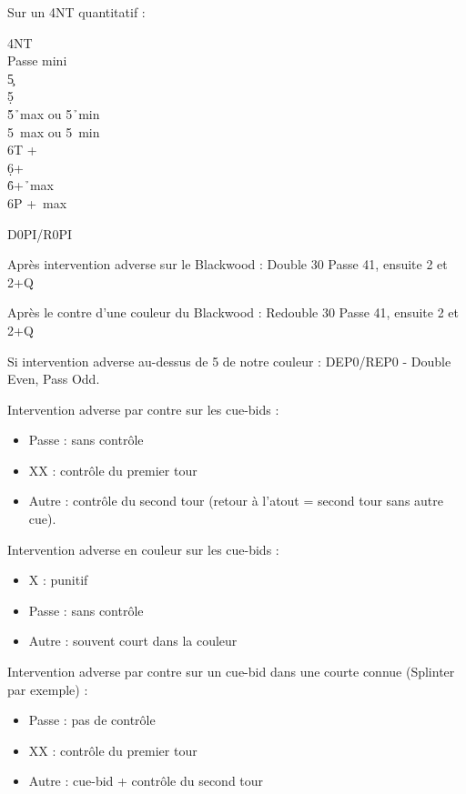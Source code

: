 \documentclass[a4paper]{article}
\begin{document}
Sur un 4NT quantitatif :

\begin{bidtable}
4NT\+\\
Passe \> mini\\
5\c {}\c \\
5\d {}\d \\
5\h {}\h\ max ou 5\h\ min\\
5\s {}\s\ max ou 5\s\ min\\
6T + \c \\
6\d {}+ \d \\
6\h {}+\h\ max\\
6P +\s\ max\-
\end{bidtable}

D0PI/R0PI

Après intervention adverse sur le Blackwood :
Double 30 Passe 41, ensuite 2 et 2+Q

Après le contre d'une couleur du Blackwood :
Redouble 30 Passe 41, ensuite 2 et 2+Q

Si intervention adverse au-dessus de 5 de notre couleur :
DEP0/REP0 - Double Even, Pass Odd.

Intervention adverse par contre sur les cue-bids :

\begin{itemize}
\item Passe : sans contrôle

\item XX : contrôle du premier tour

\item Autre : contrôle du second tour (retour à l'atout = second tour sans autre cue).

\end{itemize}

Intervention adverse en couleur sur les cue-bids :

\begin{itemize}
\item X : punitif

\item Passe : sans contrôle

\item Autre : souvent court dans la couleur

\end{itemize}

Intervention adverse par contre sur un cue-bid dans une courte connue (Splinter par exemple) :

\begin{itemize}
\item Passe : pas de contrôle

\item XX : contrôle du premier tour

\item Autre : cue-bid + contrôle du second tour

\end{itemize}
\end{document}
